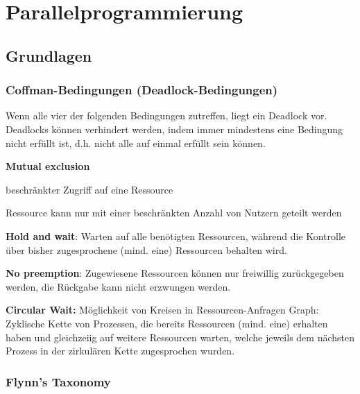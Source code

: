 \chapter{Parallelprogrammierung}
\section{Grundlagen}
\subsection{Coffman-Bedingungen (Deadlock-Bedingungen) }
Wenn alle vier der folgenden Bedingungen zutreffen, liegt ein Deadlock vor.
Deadlocks können verhindert werden, indem immer mindestens eine Bedingung nicht erfüllt ist, d.h. nicht alle auf einmal erfüllt sein können.
\begin{compactenum}
	\item \textbf{Mutual exclusion}
		\begin{compactitem}
			\item beschränkter Zugriff auf eine Ressource
			\item Ressource kann nur mit einer beschränkten Anzahl von Nutzern geteilt werden
		\end{compactitem}
	\item \textbf{Hold and wait}: Warten auf alle benötigten Ressourcen, während die Kontrolle über bisher zugesprochene (mind. eine) Ressourcen behalten wird.
	\item \textbf{No preemption}: Zugewiesene Ressourcen können nur freiwillig zurückgegeben werden, die Rückgabe kann nicht erzwungen werden.
	\item \textbf{Circular Wait: }Möglichkeit von Kreisen in Ressourcen-Anfragen Graph:\\
				Zyklische Kette von Prozessen, die bereits Ressourcen (mind. eine) erhalten haben und gleichzeiig auf weitere Ressourcen warten, welche jeweils dem nächsten Prozess in der zirkulären Kette zugesprochen wurden.
\end{compactenum}

\subsection{Flynn's Taxonomy }
\noindent{}

